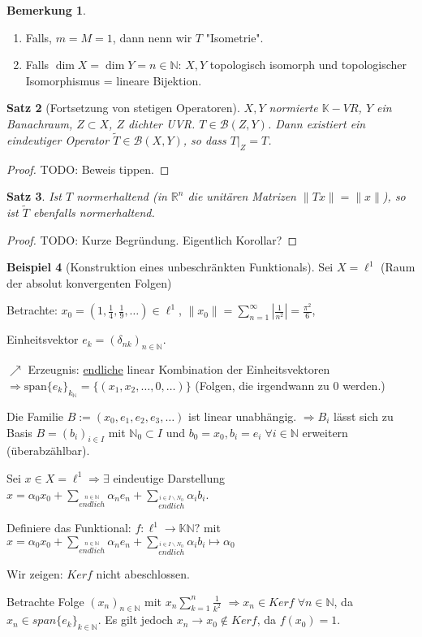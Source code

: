 \documentclass[ngerman]{report}
\theoremstyle{plain}%
\newtheorem{thm}{Satz}[chapter]
\theoremstyle{definition}%
\newtheorem{bsp}[thm]{Beispiel}
\theoremstyle{myStyle}
\newtheorem{bem}[thm]{Bemerkung}
\newcommand{\R}{\mathbb{R}}
\newcommand{\N}{\mathbb{N}}
\newcommand{\K}{\mathbb{K}}
\newcommand{\B}{\mathcal{B}} %
\newcommand{\BS}[1][X,Y]{\mathcal{B}(#1)} %
\newcommand{\norm}[1]{\|#1\|}
\newcommand{\df}[1][]{%
	\overset{#1}{\Rightarrow}
}
\newcommand{\qmarks}[1]{"{}#1"{}}
\begin{document}
	\begin{bem}
		\begin{enumerate}
			\item Falls, $m=M=1$, dann nenn wir $T$ \qmarks{Isometrie}.
			\item Falls $\dim X = \dim Y = n\in \N$: $X,Y$ topologisch isomorph und topologischer Isomorphismus = lineare Bijektion.
		\end{enumerate}
	\end{bem}
	\begin{thm}[Fortsetzung von stetigen Operatoren]
		$X,Y$ normierte $\K-VR$, $Y$ ein Banachraum, $Z\subset X$, $Z$ dichter UVR.
		$T\in \B(Z,Y)$. Dann existiert ein eindeutiger Operator $\tilde{T} \in \BS$, so dass
		$T|_Z = T$.
	\end{thm}
	\begin{proof}
					TODO: Beweis tippen.
	\end{proof}
	\begin{thm}
					Ist $T$ normerhaltend (in $\R^n$ die unitären Matrizen $\norm{Tx} = \norm{x}$), so ist $\tilde{T}$ ebenfalls normerhaltend.
	\end{thm}
		\begin{proof}
						TODO: Kurze Begründung. Eigentlich Korollar?%
		\end{proof}

	\begin{bsp}[Konstruktion eines unbeschränkten Funktionals]
		Sei $X= \ell^1$ ({Raum der absolut konvergenten Folgen})\par
		Betrachte: $x_0 = (1, \frac{1}{4}, \frac{1}{9},\dots) \in \ell^1$, 
		$\norm{x_0} = \sum_{n=1}^\infty |\frac{1}{n^2}| = \frac{\pi^2}{6} $,\par
		Einheitsvektor $e_k = (\delta_{nk})_{n\in\N}$.\par 
		$\nearrow$ Erzeugnis: \underline{endliche} linear Kombination der Einheitsvektoren 
		$\df \text{span} \{e_k\}_{k_\N} = \{(x_1,x_2,\dots,0,\dots)\}$ (Folgen, die irgendwann zu $0$ werden.)\par
		Die Familie $B := (x_0,e_1,e_2,e_3,\dots)$ ist linear unabhängig.
		$\df B_i$ lässt sich zu Basis $B = (b_i)_{i\in I}$ mit $\N_0 \subset I$ und $b_0 = x_0, b_i = e_i \; \forall i\in \N$ erweitern (überabzählbar).\par
		Sei $x\in X= \ell^1 \df \exists$ eindeutige Darstellung 
		$x = \alpha_0 x_0 +\sum_{\overset{n\in\N}{endlich}} \alpha_n e_n + \sum_{\overset{i\in I\backslash N_0}{endlich}}\alpha_i b_i$. \par
		Definiere das Funktional: $f: \ell^1 \to \K \N?$ mit $x = \alpha_0 x_0 +\sum_{\overset{n\in\N}{endlich}} \alpha_n e_n + \sum_{\overset{i\in I\backslash N_0}{endlich}}\alpha_i b_i \mapsto \alpha_0$\par
	Wir zeigen: $Ker f$ nicht abeschlossen.\par
		Betrachte Folge $(x_n)_{n\in\N}$ mit $x_n \sum_{k=1}^n \frac{1}{k^2}$		 
		$\df x_n\in Ker f \; \forall n\in\N$, da $x_n\in span\{e_k\}_{k\in\N}$. 
		Es gilt jedoch $x_n \to x_0 \not\in Ker f$, da $f(x_0) = 1$.
	\end{bsp}
\end{document}
